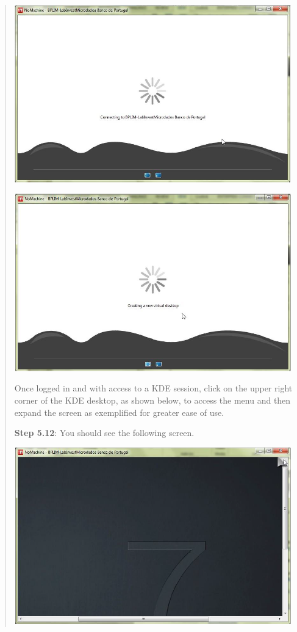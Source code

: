 \documentclass[]{book}
\begin{document}
\begin{quote}
\includegraphics[width=4.72441in,height=3.02971in]{./media/image36.png}

\includegraphics[width=4.72441in,height=3.02389in]{./media/image37.png}

Once logged in and with access to a KDE session, click on the upper
right corner of the KDE desktop, as shown below, to access the menu
and then expand the screen as exemplified for greater ease of use.

\textbf{Step 5.12}: You should see the following screen.

\includegraphics[width=4.72441in,height=3.01274in]{./media/image38.png}


\end{quote}
\end{document}
